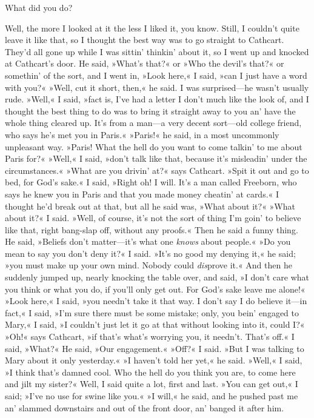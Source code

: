 \begin{dialogue}
 What did you do?

 Well, the more I looked at it the less I liked it, you know. Still, I couldn't quite leave it like that, so I thought the best way was to go straight to Cathcart. They'd all gone up while I was sittin' thinkin' about it, so I went up and knocked at Cathcart's door.  He said, »What's that?« or »Who the devil's that?« or somethin' of the sort, and I went in, »Look here,« I said, »can I just have a word with you?« »Well, cut it short, then,« he said. I was surprised—he wasn't usually rude. »Well,« I said, »fact is, I've had a letter I don't much like the look of, and I thought the best thing to do was to bring it straight away to you an' have the whole thing cleared up. It's from a man—a very decent sort—old college friend, who says he's met you in Paris.« »Paris!« he said, in a most uncommonly unpleasant way. »Paris!  What the hell do you want to come talkin' to me about Paris for?« »Well,« I said, »don't talk like that, because it's misleadin' under the circumstances.« »What are you drivin' at?« says Cathcart. »Spit it out and go to bed, for God's sake.« I said, »Right oh! I will. It's a man called Freeborn, who says he knew you in Paris and that you made money cheatin' at cards.« I thought he'd break out at that, but all he said was, »What about it?« »What about it?« I said. »Well, of course, it's not the sort of thing I'm goin' to believe like that, right bang-slap off, without any proofs.« Then he said a funny thing. He said, »Beliefs don't matter—it's what one \textit{knows} about people.« »Do you mean to say you don't deny it?« I said. »It's no good my denying it,« he said; »you must make up your own mind. Nobody could \textit{dis}prove it.« And then he suddenly jumped up, nearly knocking the table over, and said, »I don't care what you think or what you do, if you'll only get out. For God's sake leave me alone!« »Look here,« I said, »you needn't take it that way. I don't say I do believe it—in fact,« I said, »I'm sure there must be some mistake; only, you bein' engaged to Mary,« I said, »I couldn't just let it go at that without looking into it, could I?« »Oh!« says Cathcart, »if that's what's worrying you, it needn't. That's off.« I said, »What?« He said, »Our engagement.« »Off?« I said. »But I was talking to Mary about it only yesterday.« »I haven't told her yet,« he said. »Well,« I said, »I think that's damned cool.  Who the hell do you think you are, to come here and jilt my sister?« Well, I said quite a lot, first and last. »You can get out,« I said; »I've no use for swine like you.« »I will,« he said, and he pushed past me an' slammed downstairs and out of the front door, an' banged it after him.


\end{dialogue}
